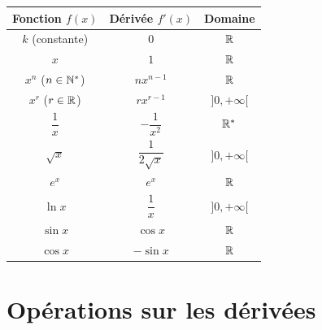 \begin{propriete}
  \bigskip
  \begin{center}
  \renewcommand{\arraystretch}{2.2}
  \begin{tabular}{|c|c|c|}
    \hline
    \textbf{\color{forest}Fonction $f(x)$}
      & \textbf{\color{forest}D\'{e}riv\'{e}e $f'(x)$}
      & \textbf{\color{forest}Domaine} \\
    \hline\hline
    $k$ (constante)     & $0$                        & $\mathbb{R}$ \\
    \hline
    $x$                 & $1$                        & $\mathbb{R}$ \\
    \hline
    $x^n$ \; ($n \in \mathbb{N}^*$) & $nx^{n-1}$            & $\mathbb{R}$ \\
    \hline
    $x^r$ \; ($r \in \mathbb{R}$)   & $rx^{r-1}$            & $]0,+\infty[$ \\
    \hline
    $\dfrac{1}{x}$      & $-\dfrac{1}{x^2}$          & $\mathbb{R}^*$ \\
    \hline
    $\sqrt{x}$          & $\dfrac{1}{2\sqrt{x}}$     & $]0,+\infty[$ \\
    \hline
    $e^x$               & $e^x$                      & $\mathbb{R}$ \\
    \hline
    $\ln x$             & $\dfrac{1}{x}$             & $]0,+\infty[$ \\
    \hline
    $\sin x$            & $\cos x$                   & $\mathbb{R}$ \\
    \hline
    $\cos x$            & $-\sin x$                  & $\mathbb{R}$ \\
    \hline
  \end{tabular}
  \end{center}
\end{propriete}

\newpage
\section{Op\'{e}rations sur les d\'{e}riv\'{e}es}

